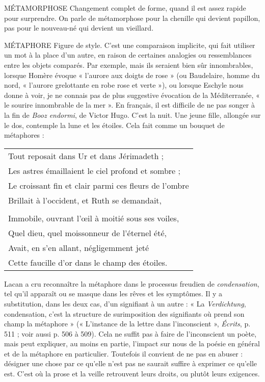 MÉTAMORPHOSE Changement complet de forme, quand il est assez
rapide pour surprendre. On parle de métamorphose
pour la chenille qui devient papillon, pas pour le nouveau-né qui devient un
vieillard.

MÉTAPHORE Figure de style. C’est une comparaison implicite, qui fait utiliser
un mot à la place d’un autre, en raison de certaines analogies
ou ressemblances entre les objets comparés. Par exemple, mais ils seraient
bien sûr innombrables, lorsque Homère évoque « l'aurore aux doigts de rose »
(ou Baudelaire, homme du nord, « l’aurore grelottante en robe rose et verte »),
ou lorsque Eschyle nous donne à voir, je ne connais pas de plus suggestive évocation
de la Méditerranée, « le sourire innombrable de la mer ». En français, il
est difficile de ne pas songer à la fin de {\it Booz endormi}, de Victor Hugo. C’est la
nuit. Une jeune fille, allongée sur le dos, contemple la lune et les étoiles. Cela
fait comme un bouquet de métaphores :

{\footnotesize
\begin{center}
\begin{tabular}{l}
Tout reposait dans Ur et dans Jérimadeth ; \\
Les astres émaillaient le ciel profond et sombre ; \\
Le croissant fin et clair parmi ces fleurs de l'ombre \\
Brillait à l'occident, et Ruth se demandait, \\
 \\
Immobile, ouvrant l'œil à moitié sous ses voiles, \\
Quel dieu, quel moissonneur de l'éternel été, \\
Avait, en s’en allant, négligemment jeté \\
Cette faucille d’or dans le champ des étoiles. \\
\end{tabular}
\end{center}
}

Lacan a cru reconnaître la métaphore dans le processus freudien de {\it condensation},
tel qu’il apparaît ou se masque dans les rêves et les symptômes. Il y a
substitution, dans les deux cas, d’un signifiant à un autre : « La {\it Verdichtung},
condensation, c’est la structure de surimposition des signifiants où prend son
champ la métaphore » (« L’instance de la lettre dans l'inconscient », {\it Écrits},
p. 511 ; voir aussi p. 506 à 509). Cela ne suffit pas à faire de l’inconscient un
poète, mais peut expliquer, au moins en partie, l'impact sur nous de la poésie
en général et de la métaphore en particulier. Toutefois il convient de ne pas en
abuser : désigner une chose par ce qu’elle n’est pas ne saurait suffire à exprimer
ce qu’elle est. C’est où la prose et la veille retrouvent leurs droits, ou plutôt
leurs exigences.

